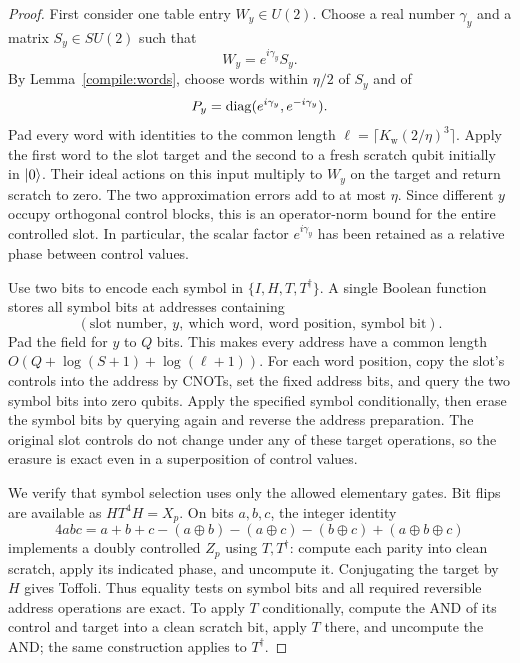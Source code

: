\begin{proof}
First consider one table entry $W_y\in U(2)$. Choose a real number $\gamma_y$
and a matrix $S_y\in SU(2)$ such that
\[
 W_y=e^{i\gamma_y}S_y.
\]
By Lemma~\ref{compile:words}, choose words within $\eta/2$ of $S_y$ and of
\[
 P_y=\operatorname{diag}(e^{i\gamma_y},e^{-i\gamma_y}).
\]
Pad every word with identities to the common length
$\ell=\lceil K_{\mathrm w}(2/\eta)^3\rceil$. Apply the first word to the slot target
and the second to a fresh scratch qubit initially in $\lvert 0\rangle$. Their ideal
actions on this input multiply to $W_y$ on the target and return scratch
to zero. The two approximation errors add to at most $\eta$. Since
different $y$ occupy orthogonal control blocks, this is an operator-norm
bound for the entire controlled slot. In particular, the scalar factor
$e^{i\gamma_y}$ has been retained as a relative phase between control
values.

Use two bits to encode each symbol in $\{I,H,T,T^\dagger\}$. A single
Boolean function stores all symbol bits at addresses containing
\[
 (\text{slot number},\ y,\ \text{which word},\
   \text{word position},\ \text{symbol bit}).
\]
Pad the field for $y$ to $Q$ bits. This makes every address have a common
length $O(Q+\log(S+1)+\log(\ell+1))$. For each word position, copy the
slot's controls into the address by CNOTs, set the fixed address bits, and
query the two symbol bits into zero qubits. Apply the specified symbol
conditionally, then erase the symbol bits by querying again and reverse
the address preparation. The original slot controls do not change under
any of these target operations, so the erasure is exact even in a
superposition of control values.

We verify that symbol selection uses only the allowed elementary gates.
Bit flips are available as $HT^4H=X_p$. On bits $a,b,c$, the integer identity
\begin{equation}\label{compile:parity}
 4abc=a+b+c-(a\oplus b)-(a\oplus c)-(b\oplus c)
                         +(a\oplus b\oplus c)
\end{equation}
implements a doubly controlled $Z_p$ using $T,T^\dagger$: compute each
parity into clean scratch, apply its indicated phase, and uncompute it.
Conjugating the target by $H$ gives Toffoli. Thus equality tests on symbol
bits and all required reversible address operations are exact.
To apply $T$ conditionally, compute the AND of its control and target into
a clean scratch bit, apply $T$ there, and uncompute the AND; the same
construction applies to $T^\dagger$.


\end{proof}
